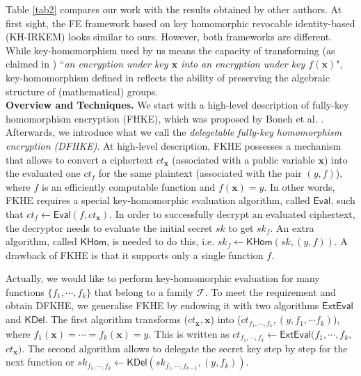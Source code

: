 \documentclass[runningheads,10pt]{llncs}
\begin{document}
Table \ref{tab2} compares our work with the results obtained by other authors.
At first sight, the FE framework based on key homomorphic revocable identity-based (KH-IRKEM) \cite{SSS+20} 
looks similar to ours. 
However, both frameworks are different.
While key-homomorphism used by us means the capacity of transforming 
(as claimed in \cite[Subsection 1.1]{BGG+14}) 
``\textit{an encryption under key $\mathbf{x}$ into an encryption under key $f(\mathbf{x})$}", 
key-homomorphism  defined in \cite[Definition 8]{SSS+20}  
reflects the ability of  preserving the algebraic structure of (mathematical) groups. \\

\noindent \textbf{Overview and Techniques.}  
We start with a high-level description of fully-key homomorphism encryption (FHKE), 
which was proposed by Boneh et al. \cite{BGG+14}. 
Afterwards, we introduce what we call the \textit{delegetable  fully-key homomorphism encryption (DFHKE)}. 
At high-level description, FKHE possesses a mechanism that allows to convert a ciphertext $ct_\mathbf{x}$ 
(associated with a public variable
 $\mathbf{x}$) into the evaluated one $ct_f$ for the same plaintext (associated with the pair $(y,f)$),
 where $f$ is an efficiently computable function and $f(\mathbf{x})=y$. 
 In other words,
 FKHE requires a special key-homomorphic evaluation algorithm, 
 called $\mathsf{Eval}$, such that
  $ct_f \leftarrow \mathsf{Eval}(f, ct_\mathbf{x})$.
In order to successfully decrypt an evaluated ciphertext, 
the decryptor needs to evaluate the initial secret $sk$ to get $sk_f$.
An extra algorithm, called $\mathsf{KHom}$, is needed to do this, i.e.
$sk_f \leftarrow \mathsf{KHom}(sk,(y,f))$.  
A drawback of FKHE is that it supports only a single function $f$.  

Actually, we would like to perform
key-homomorphic evaluation for many functions $\{f_1,\cdots, f_k\}$ that belong to a family $\mathcal{F}$. 
To meet the requirement and obtain DFKHE,
we generalise FKHE  by endowing  it with two algorithms $\mathsf{ExtEval}$ and $\mathsf{KDel}$.
The first algorithm transforms 
 ($ct_\mathbf{x}, \mathbf{x}$) into ($ct_{f_1,\cdots, f_k}, (y,f_1, \cdots f_k)$), where $f_1(\mathbf{x})=\cdots=f_k(\mathbf{x})=y$. 
 This is written as $ct_{f_1,\cdots, f_k} \leftarrow \mathsf{ExtEval}(f_1,\cdots, f_k,$ $ ct_\mathbf{x})$.
 The second algorithm 
 allows to delegate the secret key step by step
 for the next function or $sk_{f_1, \cdots, f_k} \leftarrow \mathsf{KDel}(sk_{f_1, \cdots, f_{k-1}}, (y,f_k))$.
 
\end{document}
